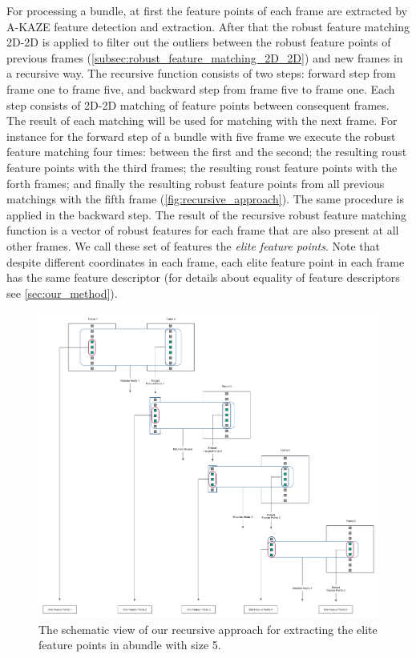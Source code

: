 For processing a bundle, at first the feature points of each frame are extracted by A-KAZE feature detection and extraction. 
After that the robust feature matching 2D-2D is applied to filter out the outliers between the robust feature points of previous frames (\autoref{subsec:robust_feature_matching_2D_2D}) and new frames in a recursive way. 
The recursive function consists of two steps: forward step from frame one to frame five, and backward step from frame five to frame one. Each step consists of 2D-2D matching of feature points between consequent frames. The result of each matching will be used for matching with the next frame. For instance for the forward step of a bundle with five frame we execute the robust feature matching four times: between the first and the second; the resulting roust feature points with the third frames; the resulting roust feature points with the forth frames; and finally the resulting robust feature points from all previous matchings with the fifth frame (\autoref{fig:recursive_approach}). The same procedure is applied in the backward step. 
The result of the recursive robust feature matching function is a vector of robust features for each frame that are also present at all other frames. We call these set of features the \textit{elite feature points}. Note that despite different coordinates in each frame, each elite feature point in each frame has the same feature descriptor (for details about equality of feature descriptors see \autoref{sec:our_method}). 

\begin{figure}[H]
  \centering
  \includegraphics[width=\textwidth]{figures/recursive_approach}
  \caption{The schematic view of our recursive approach for extracting the elite feature points in abundle with size 5.} \label{fig:recursive_approach}
\end{figure}
 
